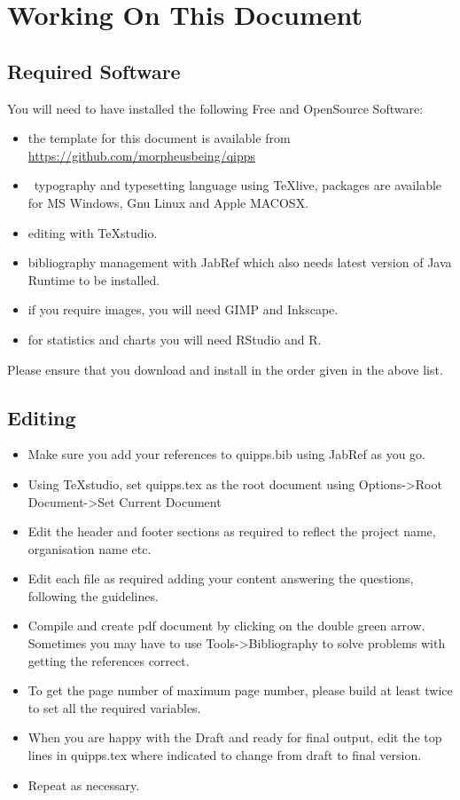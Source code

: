\documentclass[qipps.tex]{subfiles}
\begin{document}
\section{Working On This Document}
\subsection{Required Software}
You will need to have installed the following Free and OpenSource Software:
\begin{itemize}
\item the template for this document is available from \url{https://github.com/morpheusbeing/qipps}
\item \LaTeXe\ typography and typesetting language using TeXlive\cite{TXUG2016}, packages are available for MS Windows, Gnu Linux and Apple MACOSX.
\item editing with TeXstudio\cite{TXDT2016}.
\item bibliography management with JabRef\cite{JRPT2016} which also needs latest version of Java Runtime to be installed.
\item if you require images, you will need GIMP\cite{GIMPDT2016} and Inkscape\cite{IDT2016}.
\item for statistics and charts you will need RStudio\cite{RSDT2016} and R\cite{RPT2016}.
\end{itemize}

Please ensure that you download and install in the order given in the above list.

\subsection{Editing}
\begin{itemize}
\item Make sure you add your references to quipps.bib using JabRef as you go.
\item Using TeXstudio, set quipps.tex as the root document using Options->Root Document->Set Current Document
\item Edit the header and footer sections as required to reflect the project name, organisation name etc.
\item Edit each file as required adding your content answering the questions, following the guidelines.
\item Compile and create pdf document by clicking on the double green arrow. Sometimes you may have to use Tools->Bibliography to solve problems with getting the references correct.
\item To get the page number of maximum page number, please build at least twice to set all the required variables.
\item When you are happy with the Draft and ready for final output, edit the top lines in quipps.tex where indicated to change from draft to final version.
\item Repeat as necessary.
\end{itemize}
\end{document}
